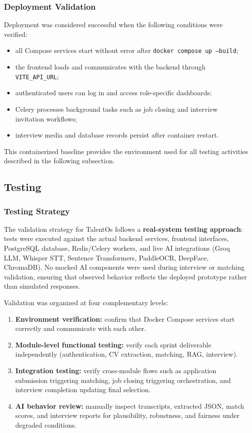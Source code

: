 \subsubsection{Deployment Validation}

Deployment was considered successful when the following conditions were verified:
\begin{itemize}
    \item all Compose services start without error after \texttt{docker compose up --build};
    \item the frontend loads and communicates with the backend through \texttt{VITE\_API\_URL};
    \item authenticated users can log in and access role-specific dashboards;
    \item Celery processes background tasks such as job closing and interview invitation workflows;
    \item interview media and database records persist after container restart.
\end{itemize}

This containerized baseline provides the environment used for all testing activities described in the following subsection.

\subsection{Testing}
\label{sec:ch5:testing}

\subsubsection{Testing Strategy}
\label{sec:ch5:testing_strategy}

The validation strategy for TalentOs follows a \textbf{real-system testing approach}: tests were executed against the actual backend services, frontend interfaces, PostgreSQL database, Redis/Celery workers, and live AI integrations (Groq LLM, Whisper STT, Sentence Transformers, PaddleOCR, DeepFace, ChromaDB). No mocked AI components were used during interview or matching validation, ensuring that observed behavior reflects the deployed prototype rather than simulated responses.

Validation was organized at four complementary levels:
\begin{enumerate}
    \item \textbf{Environment verification:} confirm that Docker Compose services start correctly and communicate with each other.
    \item \textbf{Module-level functional testing:} verify each sprint deliverable independently (authentication, CV extraction, matching, RAG, interview).
    \item \textbf{Integration testing:} verify cross-module flows such as application submission triggering matching, job closing triggering orchestration, and interview completion updating final selection.
    \item \textbf{AI behavior review:} manually inspect transcripts, extracted JSON, match scores, and interview reports for plausibility, robustness, and fairness under degraded conditions.
\end{enumerate}

